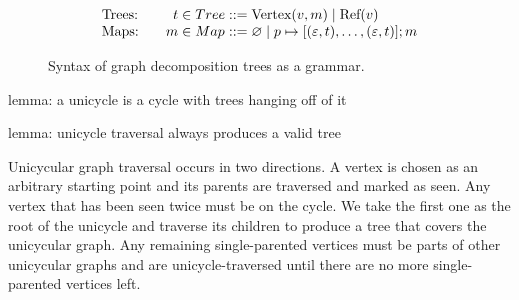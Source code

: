 
\begin{figure}
  \[
    \arraycolsep=0pt
    \begin{array}{lrlll}
      \textrm{Trees:\qquad}  & t & {}\in Tree & {}::={} & \textrm{Vertex}(v, m) \mid \textrm{Ref}(v) \\
      \textrm{Maps:}         & m & {}\in Map & {}::={} & \varnothing \mid p \mapsto [(\e, t), \ldots, (\e, t)]; m \\
    \end{array}
  \]
  \caption{Syntax of graph decomposition trees as a grammar.}
  \label{fig:Syntax of graph decomposition trees}
\end{figure}


lemma: a unicycle is a cycle with trees hanging off of it

lemma: unicycle traversal always produces a valid tree

Unicycular graph traversal occurs in two directions. A vertex is chosen as an arbitrary
starting point and its parents are traversed and marked as seen. Any vertex that
has been seen twice must be on the cycle. We take the first one as the root of
the unicycle and traverse its children to produce a tree that covers the unicycular graph.
Any remaining single-parented vertices must be parts of other unicycular graphs and are
unicycle-traversed until there are no more single-parented vertices left.
